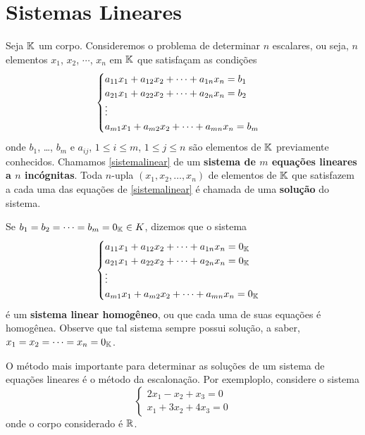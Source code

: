 \section{Sistemas Lineares}\label{ssub:sistemas_lineares}
Seja $\mathbb{K}$ um corpo. Consideremos o problema de determinar $n$ escalares, ou seja, $n$ elementos $x_1$, $x_2$, $\cdots$, $x_n$ em $\mathbb{K}$ que satisfa\c{c}am as condi\c{c}\~oes
\begin{equation}\label{sistemalinear}\index{Sistema Linear}
	\begin{cases}
		a_{11}x_1 + a_{12}x_2 + \cdots + a_{1n}x_n = b_1\\
		a_{21}x_1 + a_{22}x_2 + \cdots + a_{2n}x_n = b_2\\
		\vdots\\
		a_{m1}x_1 + a_{m2}x_2 + \cdots + a_{mn}x_n = b_m\\
	\end{cases}
\end{equation}
onde $b_1$, \dots, $b_m$ e $a_{ij}$, $1 \le i \le m$, $1 \le j \le n$ s\~ao elementos de $\mathbb{K}$ previamente conhecidos. Chamamos \eqref{sistemalinear} de um \textbf{sistema de $m$ equa\c{c}\~oes lineares a $n$ inc\'ognitas}. Toda $n$-upla $(x_1, x_2, \dots, x_n)$ de elementos de $\mathbb{K}$ que satisfazem a cada uma das equa\c{c}\~oes de \eqref{sistemalinear} \'e chamada de uma \textbf{solu\c{c}\~ao} do sistema. 

Se $b_1 = b_2 = \cdots = b_m = 0_{\mathbb{K}} \in K$, dizemos que o sistema
\begin{equation}\label{sistemalinearhomogeneo}\index{Sistema Linear}
	\begin{cases}
		a_{11}x_1 + a_{12}x_2 + \cdots + a_{1n}x_n = 0_\cp{K}\\
		a_{21}x_1 + a_{22}x_2 + \cdots + a_{2n}x_n = 0_\cp{K}\\
		\vdots\\
		a_{m1}x_1 + a_{m2}x_2 + \cdots + a_{mn}x_n = 0_\cp{K}\\
	\end{cases}
\end{equation}
\'e um \textbf{sistema linear homog\^eneo}, ou que cada uma de suas equa\c{c}\~oes \'e homog\^enea. Observe que tal sistema sempre possui solu\c{c}\~ao, a saber, $x_1 = x_2 = \cdots = x_n = 0_{\mathbb{K}}$.

O m\'etodo mais importante para determinar as solu\c{c}\~oes de um sistema de equa\c{c}\~oes lineares \'e o m\'etodo da escalona\c{c}\~ao. Por exemploplo, considere o sistema
\begin{equation}\label{exemploplo1}
\begin{cases}
	2x_1 - x_2 + x_3 = 0\\
	x_1 + 3x_2 + 4x_ 3 = 0
\end{cases}
\end{equation}
onde o corpo considerado \'e $\mathbb{R}$.

